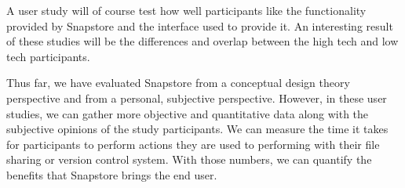 A user study will of course test how well participants like the functionality provided by Snapstore and the interface used to provide it. An interesting result of these studies will be the differences and overlap between the high tech and low tech participants.

Thus far, we have evaluated Snapstore from a conceptual design theory perspective and from a personal, subjective perspective. However, in these user studies, we can gather more objective and quantitative data along with the subjective opinions of the study participants. We can measure the time it takes for participants to perform actions they are used to performing with their file sharing or version control system. With those numbers, we can quantify the benefits that Snapstore brings the end user.





